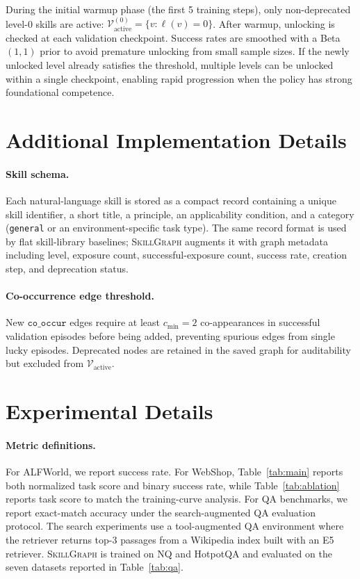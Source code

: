 During the initial warmup phase (the first 5 training steps), only non-deprecated level-0 skills are active:
$\mathcal{V}_{\text{active}}^{(0)} = \{v : \ell(v) = 0\}$.
After warmup, unlocking is checked at each validation checkpoint. Success rates are smoothed with a Beta$(1,1)$ prior to avoid premature unlocking from small sample sizes. If the newly unlocked level already satisfies the threshold, multiple levels can be unlocked within a single checkpoint, enabling rapid progression when the policy has strong foundational competence.

\section{Additional Implementation Details}
\label{app:implementation}

\paragraph{Skill schema.}
Each natural-language skill is stored as a compact record containing a unique skill identifier, a short title, a principle, an applicability condition, and a category (\texttt{general} or an environment-specific task type). The same record format is used by flat skill-library baselines; \textsc{SkillGraph} augments it with graph metadata including level, exposure count, successful-exposure count, success rate, creation step, and deprecation status.

\paragraph{Co-occurrence edge threshold.}
New $\texttt{co\_occur}$ edges require at least $c_{\min}=2$ co-appearances in successful validation episodes before being added, preventing spurious edges from single lucky episodes. Deprecated nodes are retained in the saved graph for auditability but excluded from $\mathcal{V}_{\text{active}}$.

\section{Experimental Details}
\label{app:experimental_details}

\paragraph{Metric definitions.}
For ALFWorld, we report success rate. For WebShop, Table~\ref{tab:main} reports both normalized task score and binary success rate, while Table~\ref{tab:ablation} reports task score to match the training-curve analysis. For QA benchmarks, we report exact-match accuracy under the search-augmented QA evaluation protocol. The search experiments use a tool-augmented QA environment where the retriever returns top-$3$ passages from a Wikipedia index built with an E5 retriever. \textsc{SkillGraph} is trained on NQ and HotpotQA and evaluated on the seven datasets reported in Table~\ref{tab:qa}.

